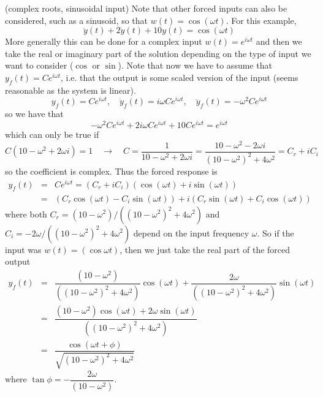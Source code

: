 \documentclass[12pt]{article}
\begin{document}
\begin{example} (complex roots, sinusoidal input) Note that other forced inputs can also be considered, such as a sinusoid, so that $w(t) = \cos(\omega t)$. For this example, 
$$\ddot y(t) + 2 \dot y(t) + 10 y(t) = \cos(\omega t)$$
More generally this can be done for a complex input $w(t) = e^{i \omega t}$ and then we take the real or imaginary part of the solution depending on the type of input we want to consider ($\cos$ or $\sin$). Note that now we have to assume that 
$y_f(t) = C e^{i \omega t}$, i.e. that the output is some scaled version of the input (seems reasonable as the system is linear).
$$
y_f(t) = C e^{i \omega t}, \quad \dot y_f(t) = i\omega C e^{i \omega t}, \quad \ddot y_f(t) = -\omega^2 C e^{i \omega t}
$$
so we have that 
$$
 -\omega^2 C e^{i \omega t} + 2i\omega C e^{i \omega t} + 10C e^{i \omega t} = e^{i \omega t}
$$
which can only be true if 
$$
C (10 - \omega^2 + 2\omega i) = 1 \quad \to \quad C = \dfrac{1}{10 - \omega^2 + 2\omega i} = \dfrac{10 - \omega^2 - 2\omega i}{(10 - \omega^2)^2 + 4\omega^2} = C_r + i C_i
$$
so the coefficient is complex.  Thus the forced response is
\begin{eqnarray}
y_f(t) &=& C e^{i \omega t} = (C_r+iC_i) (\cos(\omega t) + i\sin(\omega t))  \\
&=& (C_r \cos(\omega t) - C_i\sin(\omega t)) + i(C_r \sin(\omega t) + C_i \cos(\omega t)) 
\end{eqnarray}
where both $C_r = (10 - \omega^2)/((10 - \omega^2)^2 + 4\omega^2)$ and $C_i = -2\omega/((10 - \omega^2)^2 + 4\omega^2)$ depend on the input frequency $\omega$.
So if the input was $w(t) = (\cos \omega t )$, then we just take the real part of the forced output
\begin{eqnarray}
y_f(t) &=& \dfrac{(10 - \omega^2)}{((10 - \omega^2)^2 + 4\omega^2)} \cos(\omega t) + \dfrac{2\omega}{((10 - \omega^2)^2 + 4\omega^2)} \sin(\omega t)  \label{12}\\
&=& \dfrac{(10 - \omega^2)\cos(\omega t) +2\omega \sin(\omega t)}{((10 - \omega^2)^2 + 4\omega^2)} \\
&=& \dfrac{\cos(\omega t + \phi)}{\sqrt{(10 - \omega^2)^2 + 4\omega^2}} \label{14}
\end{eqnarray}
where $\tan \phi = -\dfrac{2\omega}{(10 - \omega^2)}$.


\end{example}
\end{document}
